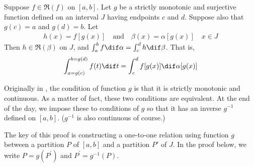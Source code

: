 \documentclass[thmcnt=section, color=blue, 12pt]{my-elegantbook}
\begin{document}
\begin{theorem}
	Suppose $f \in \mathfrak{R}(f)$ on $[a, b]$.
	Let $g$ be a strictly monotonic and surjective function defined
	on an interval $J$ having endpoints $c$ and $d$.
	Suppose also that $g(c) = a$ and $g(d) = b$.
	Let
	\begin{align*}
		h(x) = f[g(x)] \quad \text{and} \quad \beta(x) = \alpha[g(x)]
		\quad x \in J
	\end{align*}
	Then $h \in \mathfrak{R}(\beta)$ on $J$,
	and $\int_a^b f \dif \alpha = \int_c^d h \dif \beta$.
	That is,
	\begin{align*}
		\int_{a = g(c)}^{b = g(d)} f(t) \dif t
		= \int_c^d f[g(x)] \dif \alpha[g(x)]
	\end{align*}
\end{theorem}

\begin{note}
	Originally in \cite{apostolMathematicalAnalysisModern1974},
	the condition of function $g$ is that it is strictly monotonic and continuous.
	As a matter of fact, these two conditions are equivalent.
	At the end of the day,
	we impose these to conditions of $g$ so that it has
	an inverse $g^{-1}$ defined on $[a, b]$.
	($g^{-1}$ is also continuous of course.)

	The key of this proof is constructing a one-to-one relation
	using function $g$
	between a partition $P$ of $[a, b]$ and a partition $P'$ of $J$.
	In the proof below, we write $P = g(P^\prime)$
	and $P^\prime = g^{-1}(P)$.
\end{note}
\end{document}
